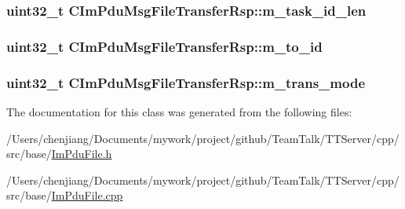 \subsubsection[{m\+\_\+task\+\_\+id\+\_\+len}]{\setlength{\rightskip}{0pt plus 5cm}uint32\+\_\+t C\+Im\+Pdu\+Msg\+File\+Transfer\+Rsp\+::m\+\_\+task\+\_\+id\+\_\+len\hspace{0.3cm}{\ttfamily [private]}}\label{class_c_im_pdu_msg_file_transfer_rsp_a487ee58f6055503ae6f14616c009b00c}
\hypertarget{class_c_im_pdu_msg_file_transfer_rsp_a71ae9df03f80e9759e1cc6ec4d09fbe0}{}
\subsubsection[{m\+\_\+to\+\_\+id}]{\setlength{\rightskip}{0pt plus 5cm}uint32\+\_\+t C\+Im\+Pdu\+Msg\+File\+Transfer\+Rsp\+::m\+\_\+to\+\_\+id\hspace{0.3cm}{\ttfamily [private]}}\label{class_c_im_pdu_msg_file_transfer_rsp_a71ae9df03f80e9759e1cc6ec4d09fbe0}
\hypertarget{class_c_im_pdu_msg_file_transfer_rsp_a7103a3f2b6ed8f3a7e028959a82d186d}{}
\subsubsection[{m\+\_\+trans\+\_\+mode}]{\setlength{\rightskip}{0pt plus 5cm}uint32\+\_\+t C\+Im\+Pdu\+Msg\+File\+Transfer\+Rsp\+::m\+\_\+trans\+\_\+mode\hspace{0.3cm}{\ttfamily [private]}}\label{class_c_im_pdu_msg_file_transfer_rsp_a7103a3f2b6ed8f3a7e028959a82d186d}


The documentation for this class was generated from the following files\+:\begin{DoxyCompactItemize}
\item 
/\+Users/chenjiang/\+Documents/mywork/project/github/\+Team\+Talk/\+T\+T\+Server/cpp/src/base/\hyperlink{_im_pdu_file_8h}{Im\+Pdu\+File.\+h}\item 
/\+Users/chenjiang/\+Documents/mywork/project/github/\+Team\+Talk/\+T\+T\+Server/cpp/src/base/\hyperlink{_im_pdu_file_8cpp}{Im\+Pdu\+File.\+cpp}\end{DoxyCompactItemize}
